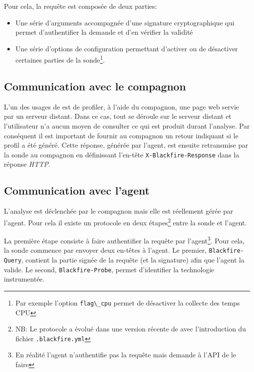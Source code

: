 Pour cela, la requête est composée de deux parties:
\begin{itemize}
\item Une série d'arguments accompagnée d'une signature cryptographique qui permet d'authentifier la demande et d'en vérifier la validité
\item Une série d'options de configuration permettant d'activer ou de désactiver certaines parties de la sonde\footnote{Par exemple l'option \verb?flag\_cpu? permet de désactiver la collecte des temps CPU}.
\end{itemize}

			\subsection{Communication avec le compagnon}
			\label{subsec:comm-compagnon}
L'un des usages de \Blackfire est de profiler, à l'aide du compagnon, une page web servie par un serveur distant. Dans ce cas, tout se déroule sur le serveur distant et l'utilisateur n'a aucun moyen de consulter ce qui est produit durant l'analyse. Par conséquent il est important de fournir au compagnon un retour indiquant si le profil a été généré. Cette réponse, générée par l'agent, est ensuite retransmise par la sonde au compagnon en définissant l'en-tête \verb|X-Blackfire-Response| dans la réponse \emph{HTTP}.

			\subsection{Communication avec l'agent}
			\label{subsec:comm-agent}
L'analyse est déclenchée par le compagnon mais elle est réellement gérée par l'agent. Pour cela il existe un protocole en deux étapes\footnote{NB: Le protocole a évolué dans une version récente de \Blackfire avec l'introduction du fichier \verb?.blackfire.yml?} entre la sonde et l'agent.

La première étape consiste à faire authentifier la requête par l'agent\footnote{En réalité l'agent n'authentifie pas la requête mais demande à l'API de le faire}. Pour cela, la sonde commence par envoyer deux en-têtes à l'agent. Le premier, \verb|Blackfire-Query|, contient la partie signée de la requête (et la signature) afin que l'agent la valide. Le second, \verb|Blackfire-Probe|, permet d'identifier la technologie instrumentée.

